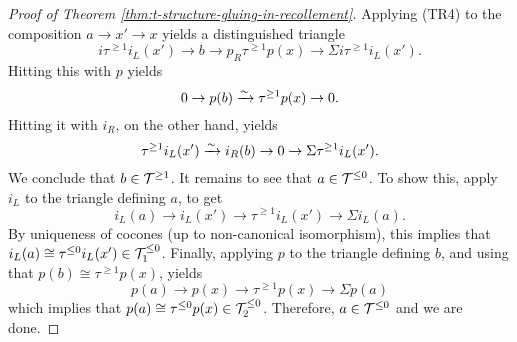 \begin{proof}[Proof of Theorem \ref{thm:t-structure-gluing-in-recollement}]
Applying (TR4) to the composition \(a \to x' \to x\) yields a distinguished triangle
\[ i\tau^{\geq 1}i_L(x') \to b \to p_R\tau^{\geq 1}p(x) \to \Sigma i\tau^{\geq 1}i_L(x'). \]
Hitting this with \(p\) yields
\[ 0 \to p(b) \xrightarrow{\sim} \tau^{\geq 1}p(x) \to 0. \]
Hitting it with \(i_R\), on the other hand, yields
\[ \tau^{\geq 1}i_L(x') \xrightarrow{\sim} i_R(b) \to 0 \to \Sigma \tau^{\geq 1}i_L(x'). \]
We conclude that \(b\in\mathcal{T}^{\geq 1}\). It remains to see that \(a\in\mathcal{T}^{\leq 0}\). To show this, apply \(i_L\) to the triangle defining \(a\), to get
\[ i_L(a) \to i_L(x') \to \tau^{\geq 1}i_L(x') \to \Sigma i_L(a). \]
By uniqueness of cocones (up to non-canonical isomorphism), this implies that \(i_L(a)\cong\tau^{\leq 0}i_L(x')\in\mathcal{T}_1^{\leq 0}\). Finally,
applying \(p\) to the triangle defining \(b\), and using that \(p(b)\cong \tau^{\geq 1}p(x)\), yields
\[ p(a) \to p(x) \to \tau^{\geq 1}p(x) \to \Sigma p(a) \]
which implies that \(p(a) \cong \tau^{\leq 0}p(x) \in\mathcal{T}_2^{\leq 0}\). Therefore, \(a\in\mathcal{T}^{\leq 0}\) and we are done.
\end{proof}

